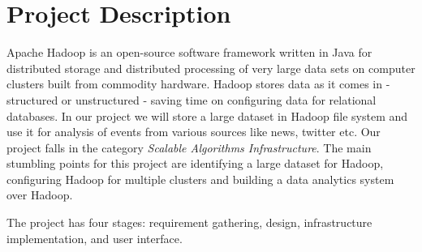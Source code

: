 \section{Project Description}
\label{sec:project-description}

Apache Hadoop is an open-source software framework written in Java for
distributed storage and distributed processing of very large data sets on
computer clusters built from commodity hardware. Hadoop stores data as it comes
in - structured or unstructured - saving time on configuring data for
relational databases. In our project we will store a large dataset in Hadoop
file system and use it for analysis of events from various sources like news,
twitter etc. Our project falls in the category \textit{Scalable Algorithms
Infrastructure}. The main stumbling points for this project are identifying a
large dataset for Hadoop, configuring Hadoop for multiple clusters and building
a data analytics system over Hadoop.

The project has four stages: requirement gathering, design, infrastructure
implementation, and user interface.
